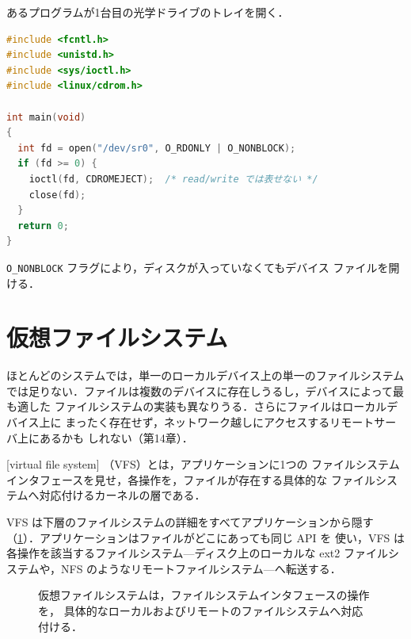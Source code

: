 \documentclass[../main.tex]{subfiles}
\begin{document}
\begin{example}
  あるプログラムが1台目の光学ドライブのトレイを開く．
  \begin{lstlisting}[language=C, numbers=none]
#include <fcntl.h>
#include <unistd.h>
#include <sys/ioctl.h>
#include <linux/cdrom.h>

int main(void)
{
  int fd = open("/dev/sr0", O_RDONLY | O_NONBLOCK);
  if (fd >= 0) {
    ioctl(fd, CDROMEJECT);  /* read/write では表せない */
    close(fd);
  }
  return 0;
}
\end{lstlisting}
  \texttt{O\_NONBLOCK} フラグにより，ディスクが入っていなくてもデバイス
  ファイルを開ける．
\end{example}

\section{仮想ファイルシステム}
\label{sec:l11-vfs}

ほとんどのシステムでは，単一のローカルデバイス上の単一のファイルシステム
では足りない．ファイルは複数のデバイスに存在しうるし，デバイスによって最も適した
ファイルシステムの実装も異なりうる．さらにファイルはローカルデバイス上に
まったく存在せず，ネットワーク越しにアクセスするリモートサーバ上にあるかも
しれない（第14章）．

\begin{definition}[仮想ファイルシステム]
  [virtual file system]%
  （VFS）とは，アプリケーションに1つの
  ファイルシステムインタフェースを見せ，各操作を，ファイルが存在する具体的な
  ファイルシステムへ対応付けるカーネルの層である．
\end{definition}

VFS は下層のファイルシステムの詳細をすべてアプリケーションから隠す
（\cref{fig:l11-vfs}）．アプリケーションはファイルがどこにあっても同じ API を
使い，VFS は各操作を該当するファイルシステム---ディスク上のローカルな ext2
ファイルシステムや，NFS のようなリモートファイルシステム---へ転送する．

\begin{figure}[tb]
  \centering
  
  \caption{仮想ファイルシステムは，ファイルシステムインタフェースの操作を，
    具体的なローカルおよびリモートのファイルシステムへ対応付ける．}
  \label{fig:l11-vfs}
\end{figure}
\end{document}
